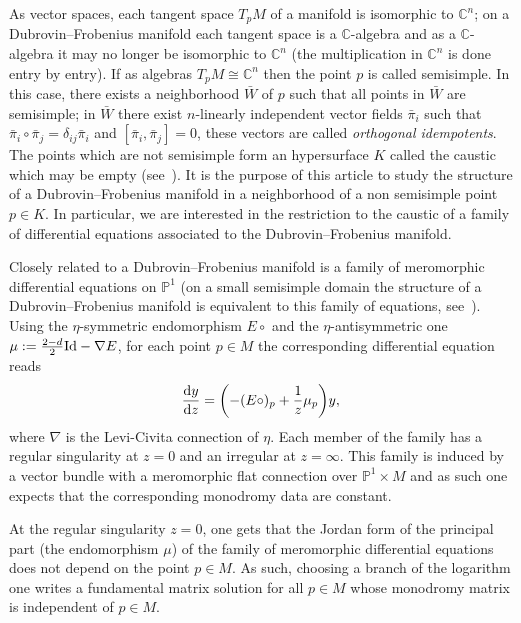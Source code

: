\documentclass[10pt,a4paper]{amsart}
\numberwithin{equation}{section}
\begin{document}
As vector spaces, each tangent space $T_{p}M$ of a manifold is isomorphic to $\mathbb{C}^{n}$; on a Dubrovin--Frobenius manifold each tangent space is a $\mathbb{C}$-algebra and as a $\mathbb{C}$-algebra it may no longer be isomorphic to $\mathbb{C}^{n}$ (the multiplication in $\mathbb{C}^{n}$ is done entry by entry). If as algebras $T_{p}M\cong\mathbb{C}^{n}$ then the point $p$ is called semisimple. In this case, there exists a neighborhood $\bar{W}$ of $p$ such that all points in $\bar{W}$ are semisimple; in $\bar{W}$ there exist $n$-linearly independent vector fields $\bar{\pi}_{i}$ such that $\bar{\pi}_{i}\circ\bar{\pi}_{j}=\delta_{ij}\bar{\pi}_{i}$ and $[\bar{\pi}_{i},\bar{\pi}_{j}]=0$, these vectors are called \emph{orthogonal idempotents}. The points which are not semisimple form an hypersurface $K$ called the caustic which may be empty (see~\cite[Proposition 2.6]{HertlingFrobenius}). It is the purpose of this article to study the structure of a Dubrovin--Frobenius manifold in a neighborhood of a non semisimple point $p\in K$. In particular, we are interested in the restriction to the caustic of a family of differential equations associated to the Dubrovin--Frobenius manifold.

Closely related to a Dubrovin--Frobenius manifold is a family of meromorphic differential equations on $\mathbb{P}^{1}$ (on a small semisimple domain the structure of a Dubrovin--Frobenius manifold is equivalent to this family of equations, see~\cite{Dubrovin:1998fe}). Using the $\eta$-symmetric endomorphism $E\circ$ and the $\eta$-antisymmetric one $\mu:=\tfrac{2-d}{2}{\rm Id}-\nabla E$, for each point $p\in M$ the corresponding differential equation reads
\begin{equation*}
 \frac{{\rm d}y}{{\rm d}z}=\biggl(-(E\circ)_{p} +\frac{1}{z}\mu_{p}\biggr)y,
\end{equation*}
where $\nabla$ is the Levi-Civita connection of $\eta$. Each member of the family has a regular singularity at $z=0$ and an irregular at $z=\infty$. This family is induced by a vector bundle with a meromorphic flat connection over $\mathbb{P}^{1}\times M$ and as such one expects that the corresponding monodromy data are constant.

 At the regular singularity $z=0$, one gets that the Jordan form of the principal part (the endomorphism $\mu$) of the family of meromorphic differential equations does not depend on the point $p\in M$. As such, choosing a branch of the logarithm one writes a fundamental matrix solution for all $p\in M$ whose monodromy matrix is independent of $p\in M$.
\end{document}
